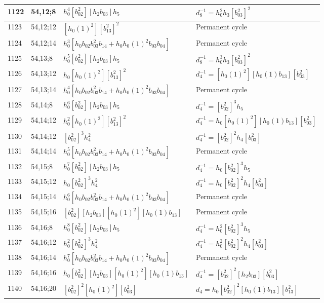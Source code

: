 \documentclass{article}
\begin{document}
\begin{longtable}{|l|l|>{\raggedright\arraybackslash}p{6cm}|>{\raggedright\arraybackslash}p{6cm}|}
\hline
1122 & 54,12;8 & $h_0^4[b_{02}^2][h_2b_{03}]h_5$ & $d_{8}^{-1}=h_0^2h_3[b_{03}^2]^2$\\
\hline
1123 & 54,12;12 & $[h_0(1)^2][b_{13}^2]^2$ & Permanent cycle\\
\hline
1124 & 54,12;14 & $h_0^3[h_0b_{02}b_{03}^2b_{14} + h_0h_0(1)^2b_{03}b_{04}]$ & Permanent cycle\\
\hline
1125 & 54,13;8 & $h_0^5[b_{02}^2][h_2b_{03}]h_5$ & $d_{8}^{-1}=h_0^3h_3[b_{03}^2]^2$\\
\hline
1126 & 54,13;12 & $h_0[h_0(1)^2][b_{13}^2]^2$ & $d_{4}^{-1}=[h_0(1)^2][h_0(1)b_{13}][b_{03}^2]$\\
\hline
1127 & 54,13;14 & $h_0^4[h_0b_{02}b_{03}^2b_{14} + h_0h_0(1)^2b_{03}b_{04}]$ & Permanent cycle\\
\hline
1128 & 54,14;8 & $h_0^6[b_{02}^2][h_2b_{03}]h_5$ & $d_{4}^{-1}=[b_{02}^2]^3h_5$\\
\hline
1129 & 54,14;12 & $h_0^2[h_0(1)^2][b_{13}^2]^2$ & $d_{4}^{-1}=h_0[h_0(1)^2][h_0(1)b_{13}][b_{03}^2]$\\
1130 & 54,14;12 & $[b_{02}^2]^3h_4^2$ & $d_{4}^{-1}=[b_{02}^2]^2h_4[b_{03}^2]$\\
\hline
1131 & 54,14;14 & $h_0^5[h_0b_{02}b_{03}^2b_{14} + h_0h_0(1)^2b_{03}b_{04}]$ & Permanent cycle\\
\hline
1132 & 54,15;8 & $h_0^7[b_{02}^2][h_2b_{03}]h_5$ & $d_{4}^{-1}=h_0[b_{02}^2]^3h_5$\\
\hline
1133 & 54,15;12 & $h_0[b_{02}^2]^3h_4^2$ & $d_{4}^{-1}=h_0[b_{02}^2]^2h_4[b_{03}^2]$\\
\hline
1134 & 54,15;14 & $h_0^6[h_0b_{02}b_{03}^2b_{14} + h_0h_0(1)^2b_{03}b_{04}]$ & Permanent cycle\\
\hline
1135 & 54,15;16 & $[b_{02}^2][h_2b_{03}][h_0(1)^2][h_0(1)b_{13}]$ & Permanent cycle\\
\hline
1136 & 54,16;8 & $h_0^8[b_{02}^2][h_2b_{03}]h_5$ & $d_{4}^{-1}=h_0^2[b_{02}^2]^3h_5$\\
\hline
1137 & 54,16;12 & $h_0^2[b_{02}^2]^3h_4^2$ & $d_{4}^{-1}=h_0^2[b_{02}^2]^2h_4[b_{03}^2]$\\
\hline
1138 & 54,16;14 & $h_0^7[h_0b_{02}b_{03}^2b_{14} + h_0h_0(1)^2b_{03}b_{04}]$ & Permanent cycle\\
\hline
1139 & 54,16;16 & $h_0[b_{02}^2][h_2b_{03}][h_0(1)^2][h_0(1)b_{13}]$ & $d_{4}^{-1}=[b_{02}^2]^2[h_2b_{03}][b_{03}^2]$\\
\hline
1140 & 54,16;20 & $[b_{02}^2]^2[h_0(1)^2][b_{03}^2]$ &$d_{4}=h_0[b_{02}^2]^2[h_0(1)b_{13}][b_{13}^2]$\\

\end{longtable}
\end{document}

